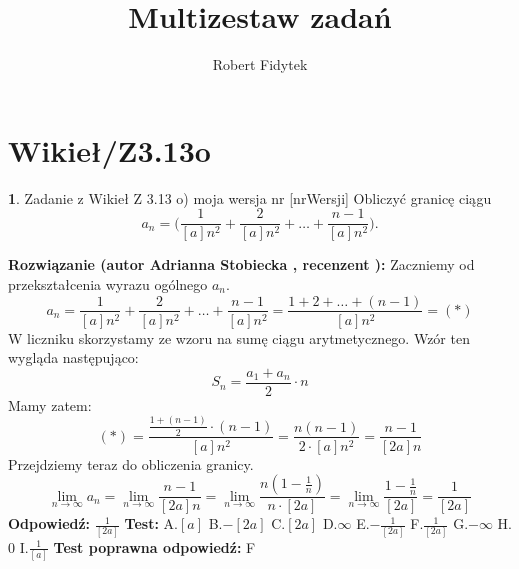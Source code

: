 \documentclass[12pt, a4paper]{article}
\title{Multizestaw zadań}
\author{Robert Fidytek}
\date{}
\theoremstyle{definition} %
\newtheorem{zad}{}
\newcommand{\kategoria}[1]{\section{#1}} %
\newcommand{\zadStart}[1]{\begin{zad}#1\newline} %
\newcommand{\zadStop}{\end{zad}}   %
\newcommand{\rozwStart}[2]{\noindent \textbf{Rozwiązanie (autor #1 , recenzent #2): }\newline} %
\newcommand{\rozwStop}{\newline}                                            %
\newcommand{\odpStart}{\noindent \textbf{Odpowiedź:}\newline}    %
\newcommand{\odpStop}{\newline}                                             %
\newcommand{\testStart}{\noindent \textbf{Test:}\newline} %
\newcommand{\testStop}{\newline} %
\newcommand{\kluczStart}{\noindent \textbf{Test poprawna odpowiedź:}\newline} %
\newcommand{\kluczStop}{\newline} %
\begin{document}
\maketitle


\kategoria{Wikieł/Z3.13o}
\zadStart{Zadanie z Wikieł Z 3.13 o) moja wersja nr [nrWersji]}
%
Obliczyć granicę ciągu 
$$a_n=\bigg(\frac{1}{[a]n^2}+\frac{2}{[a]n^2}+\dots+\frac{n-1}{[a]n^2}\bigg).$$
\zadStop
\rozwStart{Adrianna Stobiecka}{}
Zaczniemy od przekształcenia wyrazu ogólnego $a_n$.
$$a_n=\frac{1}{[a]n^2}+\frac{2}{[a]n^2}+\dots+\frac{n-1}{[a]n^2}=\frac{1+2+\dots+(n-1)}{[a]n^2}=(*)$$
W liczniku skorzystamy ze wzoru na sumę ciągu arytmetycznego. Wzór ten wygląda następująco:
$$S_n=\frac{a_1+a_n}{2}\cdot n$$ 
Mamy zatem:
$$(*)=\frac{\frac{1+(n-1)}{2}\cdot(n-1)}{[a]n^2}=\frac{n(n-1)}{2\cdot[a]n^2}=\frac{n-1}{[2a]n}$$
Przejdziemy teraz do obliczenia granicy.
$$\lim_{n\to\infty}a_n=\lim_{n\to\infty}\frac{n-1}{[2a]n}=\lim_{n\to\infty}\frac{n(1-\frac{1}{n})}{n\cdot[2a]}=\lim_{n\to\infty}\frac{1-\frac{1}{n}}{[2a]}=\frac{1}{[2a]}$$
\rozwStop
\odpStart
$\frac{1}{[2a]}$
\odpStop
\testStart
A.$[a]$
B.$-[2a]$
C.$[2a]$
D.$\infty$
E.$-\frac{1}{[2a]}$
F.$\frac{1}{[2a]}$
G.$-\infty$
H.$0$
I.$\frac{1}{[a]}$
\testStop
\kluczStart
F
\kluczStop
\end{document}
